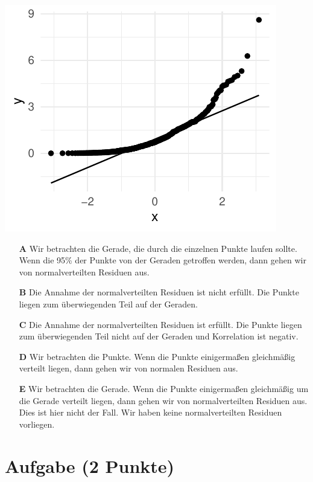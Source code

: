 \documentclass[a4paper, 9pt]{scrartcl}\usepackage[]{graphicx}\usepackage[]{xcolor}
\makeatletter
\def\maxwidth{ %
  \ifdim\Gin@nat@width>\linewidth
    \linewidth
  \else
    \Gin@nat@width
  \fi
}
\makeatother
\begin{document}
{\centering \includegraphics[width=\maxwidth]{img/mc-regression-05-a-1} 

}







\begin{enumerate}
\item [\textbf{A} \msquare] Wir betrachten die Gerade, die durch die einzelnen Punkte laufen sollte. Wenn die 95\% der Punkte von der Geraden getroffen werden, dann gehen wir von normalverteilten Residuen aus.
\item [\textbf{B} \msquare] Die Annahme der normalverteilten Residuen ist nicht erfüllt. Die Punkte liegen zum überwiegenden Teil auf der Geraden.
\item [\textbf{C} \msquare] Die Annahme der normalverteilten Residuen ist erfüllt. Die Punkte liegen zum überwiegenden Teil nicht auf der Geraden und Korrelation ist negativ.
\item [\textbf{D} \msquare] Wir betrachten die Punkte. Wenn die Punkte einigermaßen gleichmäßig verteilt liegen, dann gehen wir von normalen Residuen aus.
\item [\textbf{E} \msquare] Wir betrachten die Gerade. Wenn die Punkte einigermaßen gleichmäßig um die Gerade verteilt liegen, dann gehen wir von normalverteilten Residuen aus. Dies ist hier nicht der Fall. Wir haben keine normalverteilten Residuen vorliegen.
\end{enumerate}

\section{Aufgabe \hfill (2 Punkte)}
\end{document}
